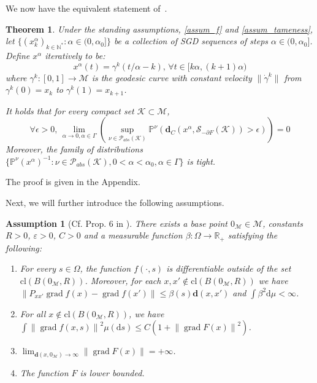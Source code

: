 \documentclass{article}
\newtheorem{assumption}{Assumption}
\newtheorem{theorem}{Theorem}
\newcommand{\CM}{\mathcal{M}}
\newcommand{\BR}{\mathbb{R}}
\newcommand{\BN}{\mathbb{N}}
\newcommand{\rd}{\mathrm{d}}
\newcommand{\bd}{\mathbf{d}}
\DeclareMathOperator{\grad}{grad}
\newcommand{\norm}[1]{\left\lVert#1\right\rVert}
\begin{document}
We now have the equivalent statement of~\cite[Theorem 2]{bianchi2022convergence}.
\begin{theorem}\label{th:weakconv}
Under the standing assumptions, \ref{assum_f} and \ref{assum_tameness}, let $\{(x^{\alpha}_k)_{k\in\BN^*}:\alpha\in(0,\alpha_0]\}$ be a collection of SGD sequences of steps $\alpha\in(0,\alpha_0]$. Define $x^{\alpha}$ iteratively to be:
\[
x^{\alpha}(t) = \gamma^k(t/\alpha-k),\,\forall t\in [k\alpha,(k+1)\alpha)
\]
where $\gamma^k:[0,1]\to \mathcal{M}$ is the geodesic curve with constant velocity $\|\dot{\gamma}^k\|$ from $\gamma^k(0)=x_k$ to $\gamma^k(1)=x_{k+1}$. 

It holds that for every compact set $\mathcal{K}\subset\mathcal{M}$,
\[
\forall \epsilon>0,\,\lim\limits_{\alpha\to 0,\alpha\in\Gamma}
\left(\sup\limits_{\nu\in\mathcal{P}_{abs}(\mathcal{K})} \mathbb{P}^{\nu}(\bd_C(x^{\alpha},\mathcal{S}_{-\partial F}(\mathcal{K})) > \epsilon)\right) = 0
\]
Moreover, the family of distributions $\{\mathbb{P}^{\nu}(x^{\alpha})^{-1}:\nu\in\mathcal{P}_{abs}(\mathcal{K}),0<\alpha<\alpha_0,\alpha\in\Gamma\}$ is tight.
\end{theorem}
The proof is given in the Appendix.




Next, we will further introduce the following assumptions. 
\begin{assumption}[Cf. Prop. 6 in \cite{bianchi2022convergence}]\label{assump:prop6}
    There exists a base point $0_\CM\in\CM$, constants $R>0$, $\varepsilon>0$, $C>0$ and a measurable function $\beta:\Omega\to\BR_+$ satisfying the following:
    \begin{enumerate}
        \item For every $s\in\Omega$, the function $f(\cdot,s)$ is differentiable outside of the set $\text{cl}(B(0_\CM,R))$. Moreover, for each $x, x'\notin \text{cl}(B(0_\CM,R))$ we have $\norm{P_{xx'}\grad f(x)-\grad f(x')} \leq \beta(s)\bd(x,x')$ and $\int \beta^2\rd\mu<\infty$. 
        \item For all $x\notin \text{cl}(B(0_\CM,R))$, we have $\int\norm{\grad f(x,s)}^2\mu(\rd s)\leq C(1+\norm{\grad F(x)}^2)$.
        \item $\lim_{\bd(x,0_\CM)\to\infty}\norm{\grad F(x)}=+\infty$.
        \item The function $F$ is lower bounded.
    \end{enumerate}
\end{assumption}
\end{document}
